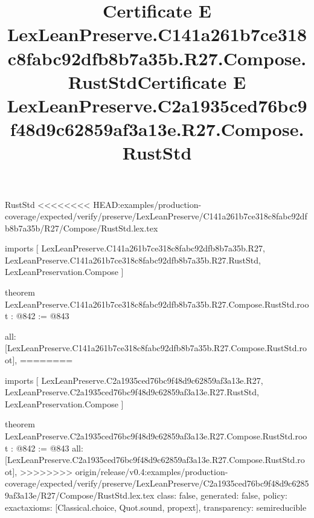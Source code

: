 \begin{lexlean}{RustStd}
<<<<<<<< HEAD:examples/production-coverage/expected/verify/preserve/LexLeanPreserve/C141a261b7ce318c8fabc92dfb8b7a35b/R27/Compose/RustStd.lex.tex
\title{Certificate E LexLeanPreserve.C141a261b7ce318c8fabc92dfb8b7a35b.R27.Compose.RustStd}
\begin{coremodule}
imports [
  LexLeanPreserve.C141a261b7ce318c8fabc92dfb8b7a35b.R27,
  LexLeanPreserve.C141a261b7ce318c8fabc92dfb8b7a35b.R27.RustStd,
  LexLeanPreservation.Compose
]

theorem LexLeanPreserve.C141a261b7ce318c8fabc92dfb8b7a35b.R27.Compose.RustStd.root : @842 := @843 {
  all: [LexLeanPreserve.C141a261b7ce318c8fabc92dfb8b7a35b.R27.Compose.RustStd.root],
========
\title{Certificate E LexLeanPreserve.C2a1935ced76bc9f48d9c62859af3a13e.R27.Compose.RustStd}
\begin{coremodule}
imports [
  LexLeanPreserve.C2a1935ced76bc9f48d9c62859af3a13e.R27,
  LexLeanPreserve.C2a1935ced76bc9f48d9c62859af3a13e.R27.RustStd,
  LexLeanPreservation.Compose
]

theorem LexLeanPreserve.C2a1935ced76bc9f48d9c62859af3a13e.R27.Compose.RustStd.root : @842 := @843 {
  all: [LexLeanPreserve.C2a1935ced76bc9f48d9c62859af3a13e.R27.Compose.RustStd.root],
>>>>>>>> origin/release/v0.4:examples/production-coverage/expected/verify/preserve/LexLeanPreserve/C2a1935ced76bc9f48d9c62859af3a13e/R27/Compose/RustStd.lex.tex
  class: false,
  generated: false,
  policy: exact{axioms: [Classical.choice, Quot.sound, propext]},
  transparency: semireducible
}


\end{coremodule}}
\end{coremodule}
\end{lexlean}

